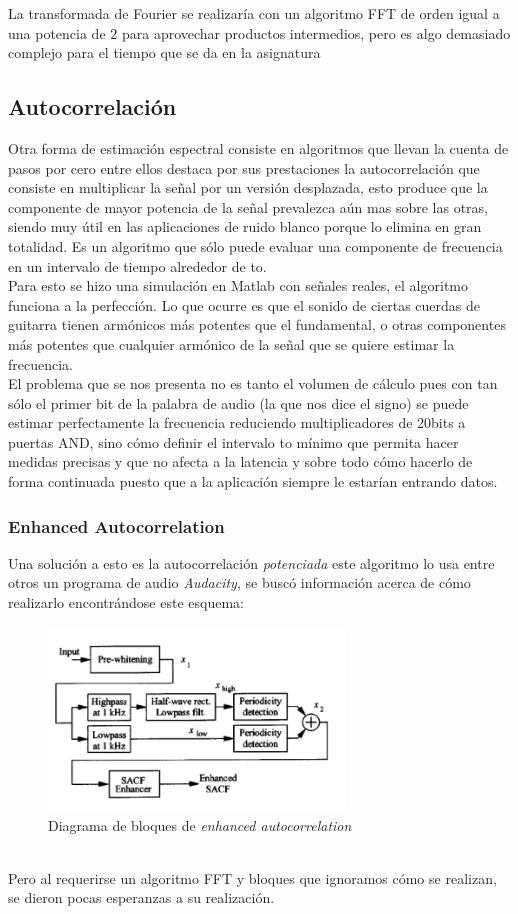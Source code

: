 	La transformada de Fourier se realizaría con un algoritmo FFT de orden igual a una potencia de 2 para aprovechar productos intermedios, pero es algo demasiado complejo para el tiempo que se da en la asignatura 
	\subsection{Autocorrelación}
	Otra forma de estimación espectral consiste en algoritmos que llevan la cuenta de pasos por cero entre ellos destaca por sus prestaciones la autocorrelación que consiste en multiplicar la señal por un versión desplazada, esto produce que la componente de mayor potencia de la señal prevalezca aún mas sobre las otras, siendo muy útil en las aplicaciones de ruido blanco porque lo elimina en gran totalidad. Es un algoritmo que sólo puede evaluar una componente de frecuencia en un intervalo de tiempo alrededor de to. \\
	Para esto se hizo una simulación en Matlab con señales reales, el algoritmo funciona a la perfección. Lo que ocurre es que el sonido de ciertas cuerdas de guitarra tienen armónicos más potentes que el fundamental, o otras componentes más potentes que cualquier armónico de la señal que se quiere estimar la frecuencia. \\
	El problema que se nos presenta no es tanto el volumen de cálculo pues con tan sólo el primer bit de la palabra de audio (la que nos dice el signo) se puede estimar perfectamente la frecuencia reduciendo multiplicadores de 20bits a puertas AND, sino cómo definir el intervalo to mínimo que permita hacer medidas precisas y que no afecta a la latencia y sobre todo cómo hacerlo de forma continuada puesto que a la aplicación siempre le estarían entrando datos.
	
	
		\subsubsection{Enhanced Autocorrelation}
		Una solución a esto es la autocorrelación \emph{potenciada} este algoritmo lo usa entre otros un programa de audio \emph{Audacity}, se buscó información acerca de cómo realizarlo encontrándose este esquema:
\begin{figure}[h]
\begin{center}
	\includegraphics[width=0.7\textwidth]{./enhanced_autocorrelation}
\caption{Diagrama de bloques de \emph{enhanced autocorrelation}}
\label{default}
\end{center}
\end{figure}\\
Pero al requerirse un algoritmo FFT y bloques que ignoramos cómo se realizan, se dieron pocas esperanzas a su realización.
		
